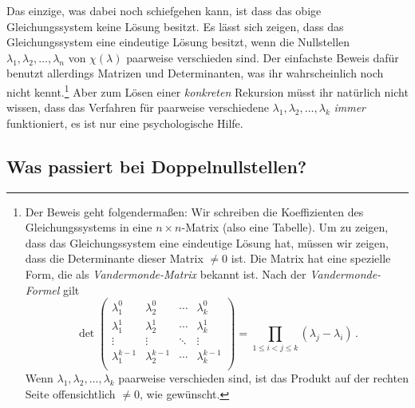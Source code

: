 Das einzige, was dabei noch schiefgehen kann, ist dass das obige Gleichungssystem keine Lösung besitzt. Es lässt sich zeigen, dass das Gleichungssystem eine eindeutige Lösung besitzt, wenn die Nullstellen $\lambda_1,\lambda_2,\dotsc,\lambda_n$ von $\chi(\lambda)$ paarweise verschieden sind. Der einfachste Beweis dafür benutzt allerdings Matrizen und Determinanten, was ihr wahrscheinlich noch nicht kennt.\footnote{Der Beweis geht folgendermaßen: Wir schreiben die Koeffizienten des Gleichungssystems in eine $n\times n$-Matrix (also eine Tabelle). Um zu zeigen, dass das Gleichungssystem eine eindeutige Lösung hat, müssen wir zeigen, dass die Determinante dieser Matrix $\neq 0$ ist. Die Matrix hat eine spezielle Form, die als \emph{Vandermonde-Matrix} bekannt ist. Nach der \emph{Vandermonde-Formel} gilt
	\begin{equation*}
		\det\begin{pmatrix}
			\lambda_1^0 & \lambda_2^0 & \dotsb & \lambda_k^0\\
			\lambda_1^1 & \lambda_2^1 & \dotsb & \lambda_k^1\\
			\vdots & \vdots & \ddots & \vdots\\
			\lambda_1^{k-1} & \lambda_2^{k-1} & \dotsb & \lambda_k^{k-1}\\
		\end{pmatrix}=\prod_{1\leqslant i<j\leqslant k}(\lambda_j-\lambda_i)\,.
	\end{equation*}
	Wenn $\lambda_1,\lambda_2,\dotsc,\lambda_k$ paarweise verschieden sind, ist das Produkt auf der rechten Seite offensichtlich $\neq 0$, wie gewünscht.} Aber zum Lösen einer \emph{konkreten} Rekursion müsst ihr natürlich nicht wissen, dass das Verfahren für paarweise verschiedene $\lambda_1,\lambda_2,\dotsc,\lambda_k$ \emph{immer} funktioniert, es ist nur eine psychologische Hilfe.

\subsection*{Was passiert bei Doppelnullstellen?}

